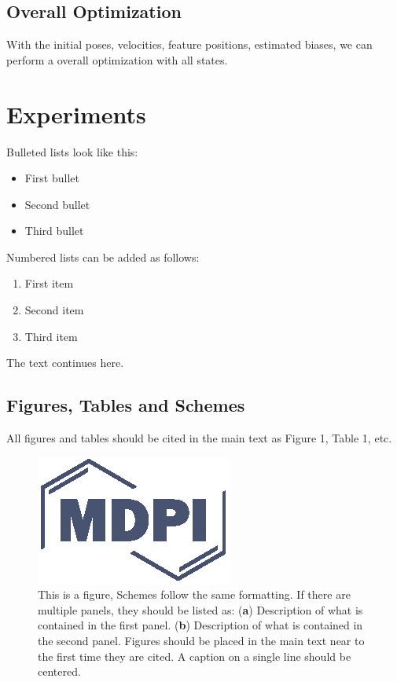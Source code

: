 \documentclass[journal,article,submit,moreauthors,pdftex]{Definitions/mdpi}
\begin{document}
\subsection{Overall Optimization}
With the initial poses, velocities, feature positions, estimated biases, we can perform a overall optimization with all states. 


\section{Experiments}



Bulleted lists look like this:
\begin{itemize}[leftmargin=*,labelsep=5.8mm]
\item	First bullet
\item	Second bullet
\item	Third bullet
\end{itemize}

Numbered lists can be added as follows:
\begin{enumerate}[leftmargin=*,labelsep=4.9mm]
\item	First item 
\item	Second item
\item	Third item
\end{enumerate}

The text continues here.

\subsection{Figures, Tables and Schemes}

All figures and tables should be cited in the main text as Figure 1, Table 1, etc.

\begin{figure}[H]
\centering
\includegraphics[width=2 cm]{Definitions/logo-mdpi}
\caption{This is a figure, Schemes follow the same formatting. If there are multiple panels, they should be listed as: (\textbf{a}) Description of what is contained in the first panel. (\textbf{b}) Description of what is contained in the second panel. Figures should be placed in the main text near to the first time they are cited. A caption on a single line should be centered.}
\end{figure}   
 
\end{document}

